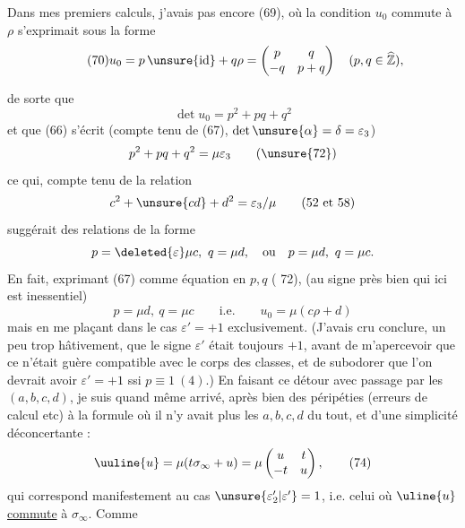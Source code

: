 Dans mes premiers calculs, j'avais pas encore  (69), où la condition $u_0$ commute à $\rho$ s'exprimait sous la forme
\[
\tag{70}u_0=p\,\unsure{\mathrm{id}}+q\rho=\begin{pmatrix}p&q\\-q&p+q\end{pmatrix}\quad(p,q\in\widehat{\mathbb Z}),
\]


de sorte que
\[
\det u_0=p^2+pq+q^2
\tag{71}
\]
et que (66) s'écrit (compte tenu de (67), 
$\det\unsure{\alpha}=\delta=\varepsilon_3$)
\[
p^2+pq+q^2=\mu\varepsilon_3
\tag{\unsure{72}}
\]
ce qui, compte tenu de la relation
\[
c^2+\unsure{cd}+d^2=\varepsilon_3/\mu
\qquad(52\text{ et }58)
\]
suggérait des relations de la forme
\[
p=\deleted{\varepsilon}\mu c,\ q=\mu d,\quad
\text{ou}\quad p=\mu d,\ q=\mu c.
\]
En fait, exprimant (67) comme équation en $p,q$
(  72), 
(au signe près bien 
qui ici est inessentiel)
\[
p=\mu d,\ q=\mu c\qquad\text{i.e.}\qquad u_0=\mu(c\rho+d)
\tag{73}
\]
mais en me plaçant dans le cas $\varepsilon'=+1$ exclusivement.
(J'avais cru conclure, un peu trop hâtivement, que le
signe $\varepsilon'$ était toujours $+1$, avant de m'apercevoir
que ce n'était guère compatible avec le corps des
classes, et de subodorer que l'on devrait avoir $\varepsilon'=+1$
ssi $p\equiv1\ (4)$.) En faisant ce détour avec passage
par les $(a,b,c,d)$, je suis quand même arrivé, après
bien des péripéties (erreurs de calcul etc) à la
formule où il n'y avait plus les $a,b,c,d$ du tout,
et d'une simplicité déconcertante :
\[
\uuline{u}=\mu(t\sigma_\infty+u)
=\mu\begin{pmatrix}u&t\\-t&u\end{pmatrix},
\tag{74}
\]
qui correspond manifestement au cas $\unsure{\varepsilon'_2|\varepsilon'}=1$, i.e.
celui où $\uline{u}$ \uline{commute} à $\sigma_\infty$. Comme



